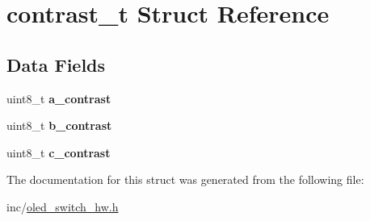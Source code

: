 \hypertarget{structcontrast__t}{}\section{contrast\+\_\+t Struct Reference}
\label{structcontrast__t}
\subsection*{Data Fields}
\begin{DoxyCompactItemize}
\item 
\hypertarget{structcontrast__t_a4217cc7ca5e77c3bf2c1acf4c1227539}{}uint8\+\_\+t {\bfseries a\+\_\+contrast}\label{structcontrast__t_a4217cc7ca5e77c3bf2c1acf4c1227539}

\item 
\hypertarget{structcontrast__t_aa795693174c63e812ab08e4ec1d3061b}{}uint8\+\_\+t {\bfseries b\+\_\+contrast}\label{structcontrast__t_aa795693174c63e812ab08e4ec1d3061b}

\item 
\hypertarget{structcontrast__t_ae3c509833c2c1062dd60396c51983f76}{}uint8\+\_\+t {\bfseries c\+\_\+contrast}\label{structcontrast__t_ae3c509833c2c1062dd60396c51983f76}

\end{DoxyCompactItemize}


The documentation for this struct was generated from the following file\+:\begin{DoxyCompactItemize}
\item 
inc/\hyperlink{oled__switch__hw_8h}{oled\+\_\+switch\+\_\+hw.\+h}\end{DoxyCompactItemize}
